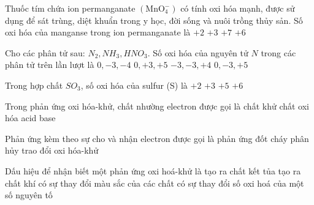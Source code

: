 \begin{ex}
	Thuốc tím chứa ion permanganate $\left(\mathrm{MnO}_4^{-}\right)$ có tính oxi hóa mạnh, được sử dụng để sát trùng, diệt khuẩn trong y học, đời sống và nuôi trồng thủy sản. Số oxi hóa của manganse trong ion permanganate là
	\choice
	{$+2$}
	{$+3$}
	{\True $+7$}
	{$+6$}
\end{ex}
\begin{ex}
	Cho các phân tử sau: $N_2, NH_3, HNO_3$. Số oxi hóa của nguyên tử $N$ trong các phân tử trên lần lượt là
	\choice
	{$0,-3,-4$}
	{$0,+3,+5$}
	{$-3,-3,+4$}
	{\True $0,-3,+5$}
\end{ex}
\begin{ex}
	Trong hợp chất $SO_3$, số oxi hóa của sulfur (S) là
	\choice
	{$+2$}
	{$+3$}
	{$+5$}
	{\True $+6$}
\end{ex}
\begin{ex}
	Trong phản ứng oxi hóa-khử, chất nhường electron được gọi là
	\choice
	{\True chất khử}
	{chất oxi hóa}
	{acid}
	{base}
\end{ex}
\begin{ex}
	Phản ứng kèm theo sự cho và nhận electron được gọi là phản ứng
	\choice
	{đốt cháy}
	{phân hủy}
	{trao đổi}
	{\True oxi hóa-khử}
\end{ex}
\begin{ex}
	Dấu hiệu để nhận biết một phản ứng oxi hoá-khử là
	\choice
	{tạo ra chất kết tủa}
	{tạo ra chất khí}
	{có sự thay đổi màu sắc của các chất}
	{\True có sự thay đổi số oxi hoá của một số nguyên tố}
\end{ex}
